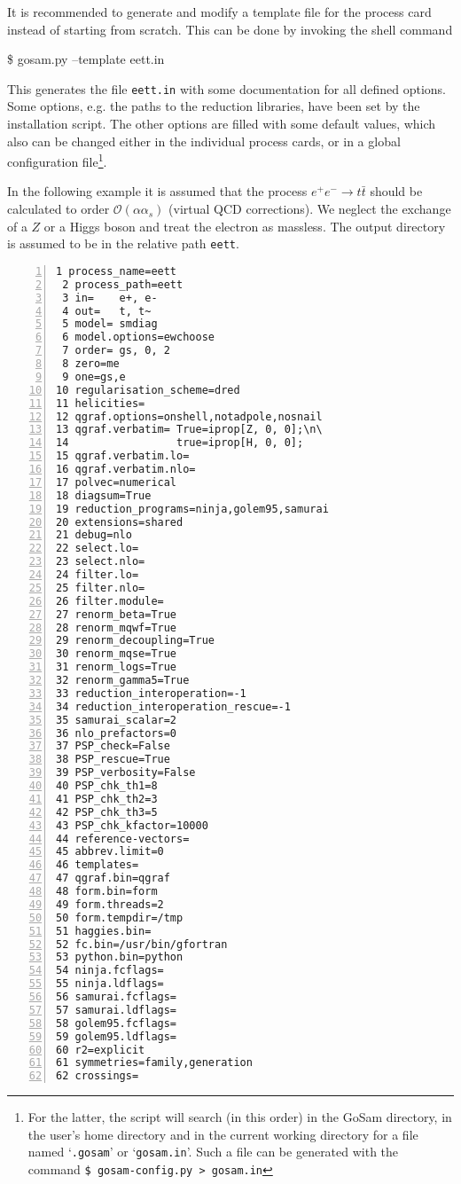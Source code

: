 \documentclass[11pt,a4paper]{refrep}
\newcommand{\gosamversion}{{2{.}0}}
\newcommand{\gosamv}[1][\gosamversion]{{\sc GoSam}\xspace}
\begin{document}
It is recommended to generate and modify a template file for the 
process card instead of
starting from scratch. This can be done by invoking the shell command
\begin{example}
\$ gosam.py --template eett.in
\end{example}
This generates the file \texttt{eett.in} with some documentation
for all defined options. Some options, e.g. the paths to the reduction libraries, 
have been set by the installation script.
The other options are filled with some default values,
which also can be changed either in the individual process cards, 
or in a global configuration file\footnote{
For the latter, the script will search (in this order) in the \gosamv{} directory,
in the user's home directory and in the current working directory for a file
named `\texttt{.gosam}' or `\texttt{gosam.in}'. Such a file can be generated
with the command
{\tt \$ gosam-config.py > gosam.in}}.

In the following  example it is assumed that the process
$e^+e^-\rightarrow t\bar{t}$ should be calculated to order
$\mathcal{O}(\alpha\alpha_s)$ (virtual QCD corrections).
We neglect the exchange of a $Z$ or a Higgs boson and treat the electron as massless.
The output directory is assumed to be in the relative path
\texttt{eett}. 

\begin{lstlisting}[gobble=3,%
     numbers=left,caption={{\tt eett.in}},%
     basicstyle=\ttfamily]
 1 process_name=eett
 2 process_path=eett
 3 in=    e+, e-
 4 out=   t, t~
 5 model= smdiag
 6 model.options=ewchoose
 7 order= gs, 0, 2
 8 zero=me
 9 one=gs,e
10 regularisation_scheme=dred
11 helicities=
12 qgraf.options=onshell,notadpole,nosnail
13 qgraf.verbatim= True=iprop[Z, 0, 0];\n\
14                 true=iprop[H, 0, 0];
15 qgraf.verbatim.lo=
16 qgraf.verbatim.nlo=
17 polvec=numerical
18 diagsum=True
19 reduction_programs=ninja,golem95,samurai
20 extensions=shared
21 debug=nlo
22 select.lo=
23 select.nlo=
24 filter.lo=
25 filter.nlo=
26 filter.module=
27 renorm_beta=True
28 renorm_mqwf=True
29 renorm_decoupling=True
30 renorm_mqse=True
31 renorm_logs=True
32 renorm_gamma5=True
33 reduction_interoperation=-1
34 reduction_interoperation_rescue=-1
35 samurai_scalar=2
36 nlo_prefactors=0
37 PSP_check=False
38 PSP_rescue=True
39 PSP_verbosity=False
40 PSP_chk_th1=8
41 PSP_chk_th2=3
42 PSP_chk_th3=5
43 PSP_chk_kfactor=10000
44 reference-vectors=
45 abbrev.limit=0
46 templates=
47 qgraf.bin=qgraf
48 form.bin=form
49 form.threads=2
50 form.tempdir=/tmp
51 haggies.bin=
52 fc.bin=/usr/bin/gfortran
53 python.bin=python
54 ninja.fcflags=
55 ninja.ldflags=
56 samurai.fcflags=
57 samurai.ldflags=
58 golem95.fcflags=
59 golem95.ldflags=
60 r2=explicit
61 symmetries=family,generation
62 crossings=
\end{lstlisting}
\end{document}
